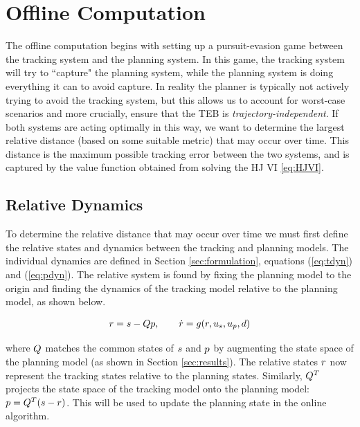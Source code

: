 \section{Offline Computation \label{sec:precomp}}
The offline computation begins with setting up a pursuit-evasion game \cite{Huang11, Chen17} between the tracking system and the planning system. 
In this game, the tracking system will try to ``capture" the planning system, while the planning system is doing everything it can to avoid capture. 
In reality the planner is typically not actively trying to avoid the tracking system, but this allows us to account for worst-case scenarios and more crucially, ensure that the TEB is \textit{trajectory-independent}. 
If both systems are acting optimally in this way, we want to determine the largest relative distance (based on some suitable metric) that may occur over time. 
This distance is the maximum possible tracking error between the two systems, and is captured by the value function obtained from solving the HJ VI \eqref{eq:HJVI}.

\subsection{Relative Dynamics}
To determine the relative distance that may occur over time we must first define the relative states and dynamics between the tracking and planning models. The individual dynamics are defined in Section \ref{sec:formulation}, equations (\ref{eq:tdyn}) and (\ref{eq:pdyn}). The relative system is found by fixing the planning model to the origin and finding the dynamics of the tracking model relative to the planning model, as shown below.

\begin{equation}
\label{eq:rdyn}
\begin{aligned}
\rstate = \tstate - \ptmat\pstate, \qquad \dot\rstate = \rdyn(\rstate, \tctrl, \pctrl, \dstb)
\end{aligned}
\end{equation}

\noindent where $Q$ matches the common states of $s$ and $p$ by augmenting the state space of the planning model (as shown in Section \ref{sec:results}).
The relative states $r$ now represent the tracking states relative to the planning states. 
Similarly, $Q^T$ projects the state space of the tracking model onto the planning model: $p = Q^T(s-r)$. 
This will be used to update the planning state in the online algorithm.


